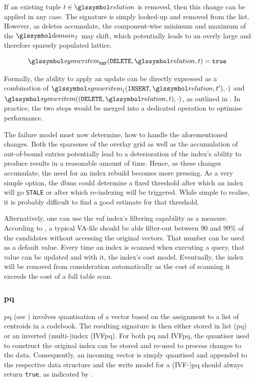 If an existing tuple $t \in \relation$ is removed, then this change can be applied in any case. The signature is simply looked-up and removed from the list. However, as deletes accumulate, the component-wise minimum and maximum of the $\domain_f$ may shift, which potentially leads to an overly large and therefore sparsely populated lattice.

\begin{equation}
    \label{equation:write_model_delete_vaf}
    \symwritem_{\mathtt{VAF}}(\mathtt{DELETE}, \relation, t) = \mathtt{true}
\end{equation}

Formally, the ability to apply an update can be directly expressed as a combination of $ \symwritem_((\mathtt{INSERT}, \relation, t^{\prime}),\cdot)$ and $ \symwritem((\mathtt{DELETE}, \relation, t), \cdot)$, as outlined in . In practice, the two steps would be merged into a dedicated operation to optimise performance.

The failure model must now determine, how to handle the aforementioned changes. Both the sparsenes of the overlay grid as well as the accumulation of out-of-bound entries potentially lead to a deterioration of the index's ability to produce results in a reasonable amount of time. Hence, as these changes accumulate, the need for an index rebuild becomes more pressing. As a very simple option, the \acrshort{dbms} could determine a fixed threshold after which an index will go \texttt{STALE} or after which re-indexing will be triggered. While simple to realise, it is probably difficult to find a good estimate for that threshold.

Alternatively, one can use the \acrshort{vaf} index's filtering capability as a measure. According to \cite{Weber:1998Va}, a typical VA-file should be able filter-out between 90 and 99\% of the candidates without accessing the original vectors. That number can be used as a default value. Every time an index is scanned when executing a query, that value can be updated and with it, the index's cost model. Eventually, the index will be removed from consideration automatically as the cost of scanning it exceeds the cost of a full table scan. 

\subsubsection{\texorpdfstring{\acrfull{pq}}{PQ}}
\acrshort{pq} (see  ) involves quantisation of a vector based on the assignment to a list of centroids in a codebook. The resulting signature is then either stored in list (\acrshort{pq}) or an inverted (multi-)index (IVF\acrshort{pq}). For both \acrshort{pq} and IVF\acrshort{pq}, the quantiser used to construct the original index can be stored and re-used to process changes to the data. Consequently, an incoming vector is simply quantised and appended to the respective data structure and the write model for a (IVF-)\acrshort{pq} should always return \texttt{true}, as indicated by .

